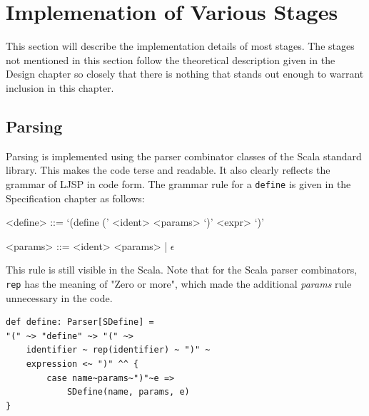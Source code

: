 \documentclass[11pt]{report}
\begin{document}
\section{Implemenation of Various Stages}
This section will describe the implementation details of most stages. The stages not mentioned in this section follow the theoretical description given in the Design chapter so closely that there is nothing that stands out enough to warrant inclusion in this chapter.
\subsection{Parsing}
Parsing is implemented using the parser combinator classes of the Scala standard library. This makes the code terse and readable. It also clearly reflects the grammar of LJSP in code form. The grammar rule for a \texttt{define} is given in the Specification chapter as follows:

\begin{grammar}
<define> ::= `(define (' <ident> <params> `)' <expr> `)'

<params> ::= <ident> <params> | $\epsilon$
\end{grammar}

This rule is still visible in the Scala. Note that for the Scala parser combinators, \texttt{rep} has the meaning of "Zero or more", which made the additional \textit{params} rule unnecessary in the code.

\begin{lstlisting}
def define: Parser[SDefine] = 
"(" ~> "define" ~> "(" ~> 
    identifier ~ rep(identifier) ~ ")" ~ 
    expression <~ ")" ^^ {
        case name~params~")"~e => 
            SDefine(name, params, e)
}
\end{lstlisting}


\end{document}
